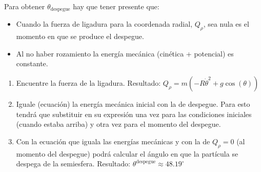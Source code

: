 \documentclass[11pt, spanish, a4paper, twoside]{article}
\begin{document}
\begin{enumerate}
\begin{minipage}[t][4.5cm]{0.62\textwidth}
		Para obtener \(\theta_\mathrm{despegue}\) hay que tener presente que:
		\begin{itemize}
			\item Cuando la fuerza de ligadura para la coordenada radial, \(Q_{\rho}\), sea nula es el momento en que se produce el despegue.
			\item Al no haber rozamiento la energía mecánica (cinética + potencial) es constante.
		\end{itemize}
	\end{minipage}
	\begin{minipage}[c][0cm][t]{0.3\textwidth}
		
	\end{minipage}
	\begin{enumerate}
		\item Encuentre la fuerza de la ligadura. 
		Resultado: \(Q_{\rho} = m \left(- R \dot{\theta}^{2} + g \cos{\left(\theta \right)}\right)\)
		\item Iguale (ecuación) la energía mecánica inicial con la de despegue. Para esto tendrá que substituir en su expresión una vez para las condiciones iniciales (cuando estaba arriba) y otra vez para el momento del despegue.
		\item Con la ecuación que iguala las energías mecánicas y con la de \(Q_{\rho}= 0\) (al momento del despegue) podrá calcular el ángulo en que la partícula se despega de la semiesfera.
		Resultado: \(\theta^\mathrm{despegue} \approx 48.19^\circ\) 
	\end{enumerate}
%

\end{enumerate}
\end{document}
